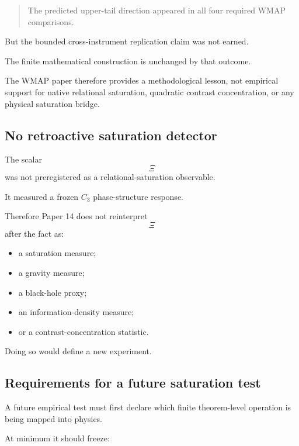 \begin{quote}
The predicted upper-tail direction appeared in all four required WMAP
comparisons.
\end{quote}

But the bounded cross-instrument replication claim was not earned.

The finite mathematical construction is unchanged by that outcome.

The WMAP paper therefore provides a methodological lesson, not
empirical support for native relational saturation, quadratic contrast
concentration, or any physical saturation bridge.

\subsection{No retroactive saturation detector}

The scalar
\[
\Xi
\]
was not preregistered as a relational-saturation observable.

It measured a frozen \(C_3\) phase-structure response.

Therefore Paper 14 does not reinterpret
\[
\Xi
\]
after the fact as:

\begin{itemize}

\item a saturation measure;

\item a gravity measure;

\item a black-hole proxy;

\item an information-density measure;

\item or a contrast-concentration statistic.

\end{itemize}

Doing so would define a new experiment.

\subsection{Requirements for a future saturation test}


A future empirical test must first declare which finite theorem-level
operation is being mapped into physics.

At minimum it should freeze:

